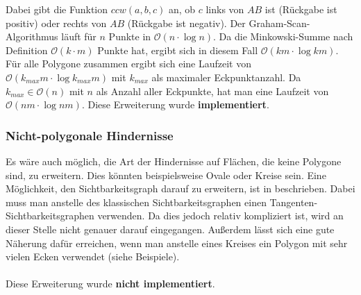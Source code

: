 \documentclass[a4paper, notitlepage, 12pt]{scrartcl}
\begin{document}
\hspace*{-1em}Dabei gibt die Funktion $ccw(a,b,c)$ an, ob $c$ links von $AB$ ist (Rückgabe ist positiv) oder rechts von $AB$ (Rückgabe ist negativ). Der Graham-Scan-Algorithmus läuft für $n$ Punkte in $\mathcal{O}(n \cdot \log n)$. Da die Minkowski-Summe nach Definition $\mathcal{O}(k \cdot m)$ Punkte hat, ergibt sich in diesem Fall $\mathcal{O}(km \cdot \log km)$. Für alle Polygone zusammen ergibt sich eine Laufzeit von $\mathcal{O}(k_{max}m \cdot \log k_{max}m)$ mit $k_{max}$ als maximaler Eckpunktanzahl. Da $k_{max} \in \mathcal{O}(n)$ mit $n$ als Anzahl aller Eckpunkte, hat man eine Laufzeit von $\mathcal{O}(nm \cdot \log nm)$. Diese Erweiterung wurde \textbf{implementiert}.
 \subsubsection{Nicht-polygonale Hindernisse}
 Es wäre auch möglich, die Art der Hindernisse auf Flächen, die keine Polygone sind, zu erweitern. Dies könnten beispielsweise Ovale oder Kreise sein. Eine Möglichkeit, den Sichtbarkeitsgraph darauf zu erweitern, ist in \cite{Src:arcvis} beschrieben. Dabei muss man anstelle des klassischen Sichtbarkeitsgraphen einen Tangenten-Sichtbarkeitsgraphen verwenden. Da dies jedoch relativ kompliziert ist, wird an dieser Stelle nicht genauer darauf eingegangen. Außerdem lässt sich eine gute Näherung dafür erreichen, wenn man anstelle eines Kreises ein Polygon mit sehr vielen Ecken verwendet (siehe Beispiele). \\ \\
 Diese Erweiterung wurde \textbf{nicht implementiert}.
\end{document}
